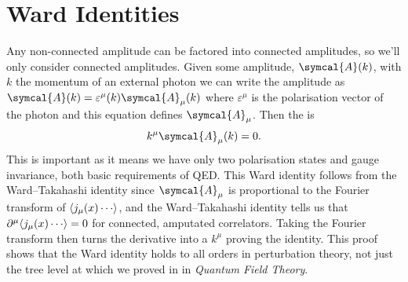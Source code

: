 \documentclass[fleqn]{NotesClass}
\newcommand*{\course}[1]{\textit{#1}}
\newcommand{\amplitude}{\symcal{A}}
\DeclarePairedDelimiter{\correlator}{\langle}{\rangle}
\begin{document}
    \section{Ward Identities}
    Any non-connected amplitude can be factored into connected amplitudes, so we'll only consider connected amplitudes.
    Given some amplitude, \(\amplitude(k)\), with \(k\) the momentum of an external photon we can write the amplitude as \(\amplitude(k) = \varepsilon^\mu(k)\amplitude_\mu(k)\) where \(\varepsilon^\mu\) is the polarisation vector of the photon and this equation defines \(\amplitude_\mu\).
    Then the  is
    \begin{equation}
        k^\mu \amplitude_\mu(k) = 0.
    \end{equation}
    This is important as it means we have only two polarisation states and gauge invariance, both basic requirements of QED.
    This Ward identity follows from the Ward--Takahashi identity since \(\amplitude_\mu\) is proportional to the Fourier transform of \(\correlator{j_\mu(x) \dotsm}\), and the Ward--Takahashi identity  tells us that \(\partial^\mu\correlator{j_\mu(x) \dotsb} = 0\) for connected, amputated correlators.
    Taking the Fourier transform then turns the derivative into a \(k^\mu\) proving the identity.
    This proof shows that the Ward identity holds to all orders in perturbation theory, not just the tree level at which we proved in in \course{Quantum Field Theory}.
    
\end{document}
